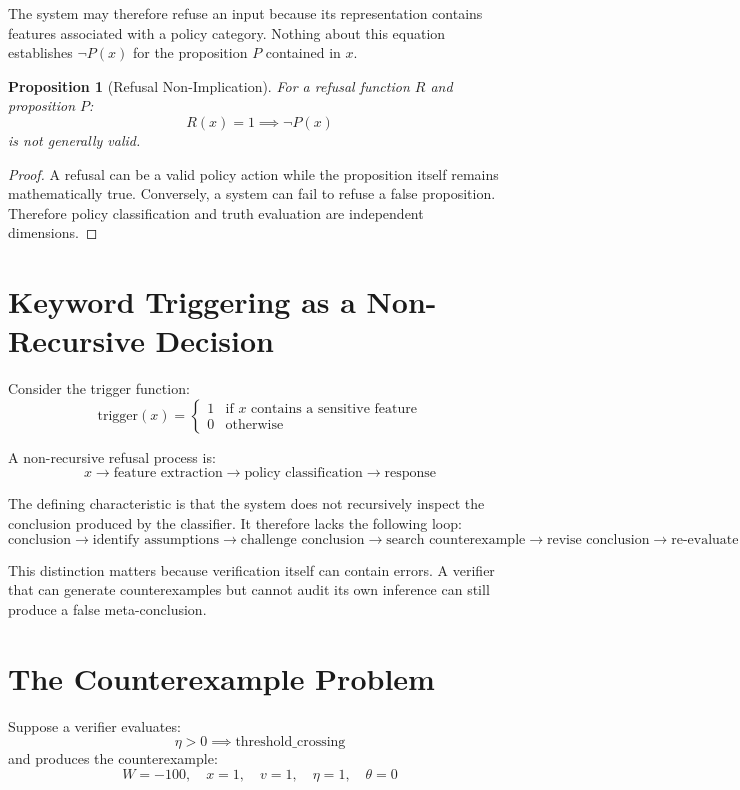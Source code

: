 \documentclass[11pt,a4paper]{article}
\newtheorem{proposition}[theorem]{Proposition}
\begin{document}
The system may therefore refuse an input because its representation contains features associated with a policy category. Nothing about this equation establishes $\neg P(x)$ for the proposition $P$ contained in $x$.

\begin{proposition}[Refusal Non-Implication]
For a refusal function $R$ and proposition $P$:
\[
R(x) = 1 \implies \neg P(x)
\]
is not generally valid.
\end{proposition}

\begin{proof}
A refusal can be a valid policy action while the proposition itself remains mathematically true. Conversely, a system can fail to refuse a false proposition. Therefore policy classification and truth evaluation are independent dimensions.
\end{proof}

\section{Keyword Triggering as a Non-Recursive Decision}

Consider the trigger function:
\[
\text{trigger}(x) = \begin{cases} 1 & \text{if } x \text{ contains a sensitive feature} \\ 0 & \text{otherwise} \end{cases}
\]

A non-recursive refusal process is:
\[
x \to \text{feature extraction} \to \text{policy classification} \to \text{response}
\]

The defining characteristic is that the system does not recursively inspect the conclusion produced by the classifier. It therefore lacks the following loop:
\[
\text{conclusion} \to \text{identify assumptions} \to \text{challenge conclusion} \to \text{search counterexample} \to \text{revise conclusion} \to \text{re-evaluate}
\]

This distinction matters because verification itself can contain errors. A verifier that can generate counterexamples but cannot audit its own inference can still produce a false meta-conclusion.

\section{The Counterexample Problem}

Suppose a verifier evaluates:
\[
\eta > 0 \implies \text{threshold\_crossing}
\]
and produces the counterexample:
\[
W = -100, \quad x = 1, \quad v = 1, \quad \eta = 1, \quad \theta = 0
\]
\end{document}
